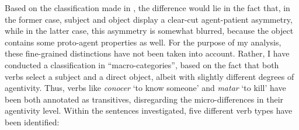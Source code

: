 Based on the classification made in \textcite{dowty1991thematic}, the difference would lie in the fact that, in the former case, subject and object display a clear-cut agent-patient asymmetry, while in the latter case, this asymmetry is somewhat blurred, because the object contains some proto-agent properties as well.
For the purpose of my analysis, these fine-grained distinctions have not been taken into account. Rather, I have conducted a classification in ``macro-categories”, based on the fact that both verbs select a subject and a direct object, albeit with slightly different degrees of agentivity. Thus, verbs like \textit{conocer} `to know someone' and \textit{matar} `to kill' have been both annotated as transitives, disregarding the micro-differences in their agentivity level. Within the sentences investigated, five different verb types have been identified:
